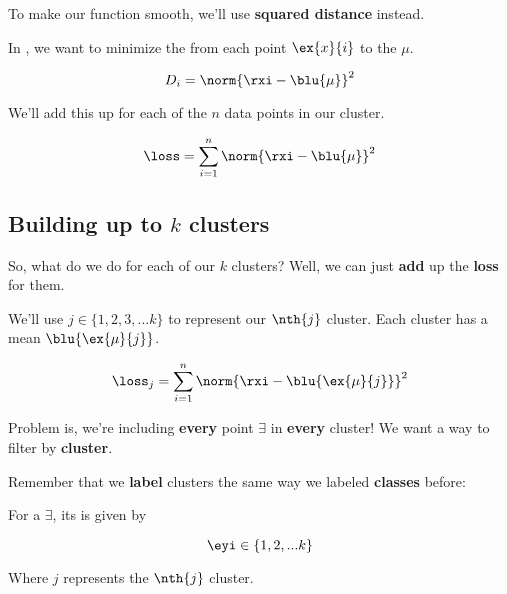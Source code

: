         To make our function smooth, we'll use \textbf{squared distance} instead.\\
        
        \begin{concept}
            In , we want to minimize the  from each point $\ex{x}{i}$ to the  $\mu$.
        \end{concept}
        
        \begin{equation}
            D_i = \norm{ \rxi - \blu{\mu} }^2
        \end{equation}
        
        We'll add this up for each of the $n$ data points in our cluster.
        
        \begin{equation}
            \loss = \sum_{i=1}^n \norm{ \rxi - \blu{\mu} }^2
        \end{equation}
        
    \subsection*{Building up to $k$ clusters}
    
        So, what do we do for each of our $k$ clusters? Well, we can just \textbf{add} up the \textbf{loss} for them.
        
        We'll use $j \in \{1, 2, 3, ... k\}$ to represent our $\nth{j}$ cluster. Each cluster has a mean $\blu{\ex{\mu}{j}}$.
        
        \newcommand{\bmuj}[0]{ \blu{\ex{\mu}{j}} } %
        
        \begin{equation}
            \loss_j = \sum_{i=1}^n \norm{ \rxi - \bmuj }^2
        \end{equation}
        
        Problem is, we're including \textbf{every} point $\exi$ in \textbf{every} cluster! We want a way to filter by \textbf{cluster}.
        
        Remember that we \textbf{label} clusters the same way we labeled \textbf{classes} before:\\
        
        \begin{notation}
            For a  $\exi$, its  is given by
            
            \begin{equation*}
                \eyi \in \{1, 2, ... k \}
            \end{equation*}
            
            Where $j$ represents the $\nth{j}$ cluster.
        \end{notation}
        
